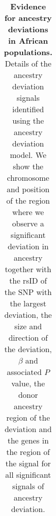 \clearpage



\begin{longtable}{|r|l|c|c|c|l|p{8cm}|l|}


\caption[Evidence for ancestry deviations in African populations.]{\textbf{Evidence for ancestry deviations in African populations.} Details of the ancestry deviation signals identified using the ancestry deviation model. We show the chromosome and position of the region where we observe a significant deviation in ancestry together with the rsID of the SNP with the largest deviation, the size and direction of the deviation, $\beta$ and associated $P$ value, the donor ancestry region of the deviation and the genes in the region of the signal for all significant signals of ancestry deviation.}
\label{tab:AllResults}\\


\end{longtable}
